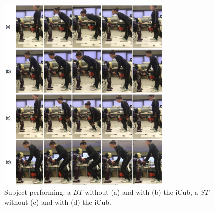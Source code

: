 %
\begin{figure}[!ht]
  \centering
    \includegraphics[width=0.75\textwidth]{figs/sequenceTask}
		  \caption{Subject performing: a $BT$ without (a) and with (b) the iCub,
		  a $ST$ without (c) and with (d) the iCub.}
			\label{fig:sequenceTask}
\end{figure}
%
%

